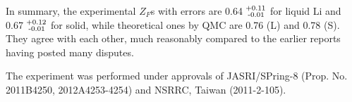\documentclass[twocolumn,showpacs,showkeys,fleqn,prl,superscriptaddress]{revtex4}%
\newcommand{\nn}[1]{\textnormal{ #1}}
\begin{document}
In summary,  the experimental $Z_F$s with errors are 0.64$^{\nn{+0.11}}_{\nn{\;-0.01}}$ for liquid Li and 0.67$^{\nn{+0.12}}_{\nn{\;-0.01}}$ for solid, while theoretical ones by QMC are 0.76 (L) and 0.78 (S).
They agree with each other, much reasonably compared to the earlier reports having posted many disputes.      



The experiment was performed under approvals of JASRI/SPring-8 (Prop. No. 2011B4250, 2012A4253-4254) and NSRRC, Taiwan (2011-2-105).
 
       

%
%



\end{document}
